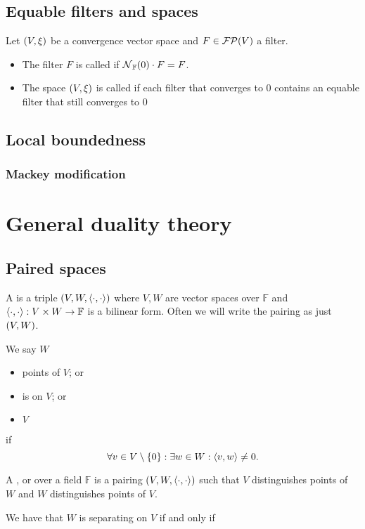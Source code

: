 \section{Equable filters and spaces}
\begin{definition}
Let $\left( V,\xi \right)$ be a convergence vector space and $F\in \operatorname{\mathcal{FP}}(V)$ a filter.
\begin{itemize}
\item The filter $F$ is called  if $\operatorname{\mathcal{N}}_{\mathbb{F}}(0)\cdot F = F$.
\item The space $\left( V, \xi \right)$ is called  if each filter that converges to $0$ contains an equable filter that still converges to $0$
\end{itemize}
\end{definition}

\section{Local boundedness}
\subsection{Mackey modification}

\chapter{General duality theory}
\section{Paired spaces}
\begin{definition}
A  is a triple $\left( V,W, \left\langle \cdot,\cdot \right\rangle \right)$ where $V,W$ are vector spaces over $\mathbb{F}$ and $\left\langle \cdot,\cdot \right\rangle: V\times W\to \mathbb{F}$ is a bilinear form. Often we will write the pairing as just $\left( V,W \right)$.

We say $W$
\begin{itemize}
\item {} points of $V$; or
\item is  on $V$; or
\item {} $V$
\end{itemize}
if 
\[ \forall v\in V\setminus\{0\}: \exists w\in W: \left\langle v,w \right\rangle \neq 0. \]

A ,  or  over a field $\mathbb{F}$ is a pairing $\left( V,W,\left\langle \cdot,\cdot \right\rangle \right)$ such that $V$ distinguishes points of $W$ and $W$ distinguishes points of $V$.
\end{definition}
We have that $W$ is separating on $V$ \textup{if and only if}

